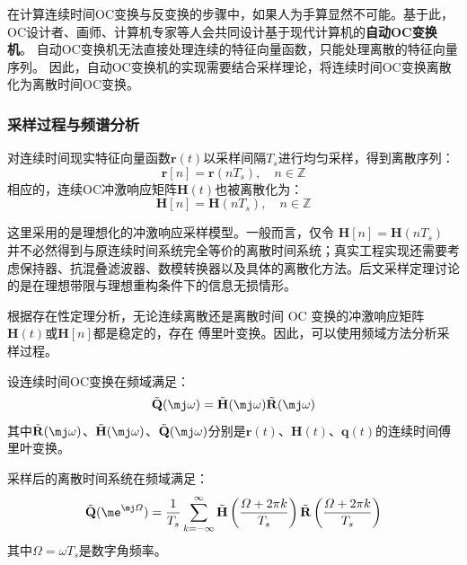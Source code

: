 在计算连续时间OC变换与反变换的步骤中，如果人为手算显然不可能。基于此，OC设计者、画师、计算机专家等人会共同设计基于现代计算机的\textbf{自动OC变换机}。
自动OC变换机无法直接处理连续的特征向量函数，只能处理离散的特征向量序列。
因此，自动OC变换机的实现需要结合采样理论，将连续时间OC变换离散化为离散时间OC变换。


\subsubsection{采样过程与频谱分析}

\begin{definition}[OC变换的采样过程]
    对连续时间现实特征向量函数$\mathbf{r}(t)$以采样间隔$T_s$进行均匀采样，得到离散序列：
    \begin{equation}
        \mathbf{r}[n] = \mathbf{r}(nT_s), \quad n \in \mathbb{Z}
    \end{equation}
    相应的，连续OC冲激响应矩阵$\mathbf{H}(t)$也被离散化为：
    \begin{equation}
        \mathbf{H}[n] = \mathbf{H}(nT_s), \quad n \in \mathbb{Z}
    \end{equation}
\end{definition}

\begin{remark}
    这里采用的是理想化的冲激响应采样模型。一般而言，仅令 $\mathbf{H}[n]=\mathbf{H}(nT_s)$ 并不必然得到与原连续时间系统完全等价的离散时间系统；真实工程实现还需要考虑保持器、抗混叠滤波器、数模转换器以及具体的离散化方法。后文采样定理讨论的是在理想带限与理想重构条件下的信息无损情形。
\end{remark}

根据存在性定理分析，无论连续离散还是离散时间 OC 变换的冲激响应矩阵$\mathbf{H}(t)$或$\mathbf{H}[n]$都是稳定的，存在
傅里叶变换。因此，可以使用频域方法分析采样过程。

\begin{theorem}[采样OC变换的频域关系]
    设连续时间OC变换在频域满足：
    \begin{equation}
        \tilde{\mathbf{Q}}(\mj\omega) = \tilde{\mathbf{H}}(\mj\omega) \tilde{\mathbf{R}}(\mj\omega)
    \end{equation}
    其中$\tilde{\mathbf{R}}(\mj\omega)$、$\tilde{\mathbf{H}}(\mj\omega)$、$\tilde{\mathbf{Q}}(\mj\omega)$分别是$\mathbf{r}(t)$、$\mathbf{H}(t)$、$\mathbf{q}(t)$的连续时间傅里叶变换。

    采样后的离散时间系统在频域满足：
    \begin{equation}
        \tilde{\mathbf{Q}}(\me^{\mj\varOmega}) = \dfrac{1}{T_s} \sum_{k=-\infty}^{\infty} \tilde{\mathbf{H}}\left(\dfrac{\varOmega + 2\pi k}{T_s}\right) \tilde{\mathbf{R}}\left(\dfrac{\varOmega + 2\pi k}{T_s}\right)
    \end{equation}
    其中$\varOmega = \omega T_s$是数字角频率。
\end{theorem}

